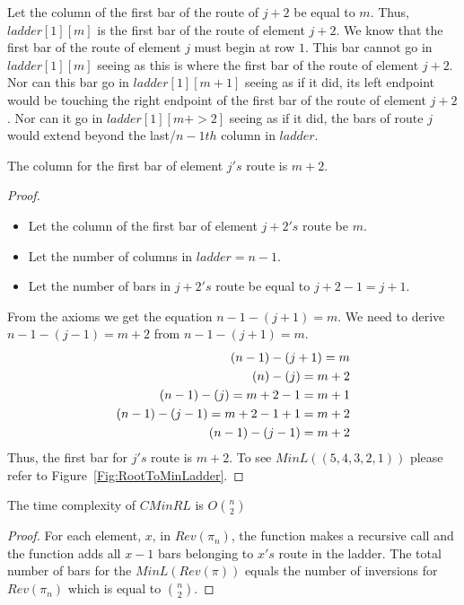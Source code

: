 Let the column of the first bar of the route of $j+2$ be equal to $m$. Thus, $ladder[1][m]$ is the first bar 
of the route of element $j+2$. We know that the first bar of the route of element $j$ must begin at row $1$. 
This bar cannot go in $ladder[1][m]$ seeing as this is where the first bar of the route of element $j+2$. 
Nor can this bar go in $ladder[1][m+1]$ seeing as if it did, its left endpoint would be touching the right 
endpoint of the first bar of the route of element $j+2$. Nor can it go in $ladder[1][m+>2]$ seeing as if it 
did, the bars of route $j$ would extend beyond the last/$n-1th$ column in $ladder$. 
\begin{lemma}
    The column for the first bar of element $j's$ route is $m+2$.
    
\end{lemma}
\begin{proof}
    \begin{itemize}
        \item     Let the column of the first bar of element $j+2's$ route be $m$. 
        \item     Let the number of columns in $ladder=n-1$.
        \item     Let the number of bars in $j+2's$ route be equal to $j+2-1=j+1$.
    \end{itemize}
        From the axioms we get the equation $n-1-(j+1)=m$.
        We need to derive $n-1-(j-1)=m+2$ from $n-1-(j+1)=m$.
   \begin{equation} \label{eq1}
        \centering
        \begin{split}
            (n-1)-(j+1)=m \\
            (n)-(j)= m+2\\
            (n-1)-(j)=m+2-1=m+1 \\ 
            (n-1)-(j-1)=m+2-1+1=m+2\\
            (n-1)-(j-1) = m+2\\
        \end{split}
    \end{equation}
   Thus, the first bar for $j's$ route is $m+2$.
   To see $MinL((5,4,3,2,1))$ please refer to Figure~\ref{Fig:RootToMinLadder}.
\end{proof}


\begin{lemma}
    The time complexity of $CMinRL$ is $O{n \choose 2}$ 
\end{lemma}
\begin{proof}
    For each element, $x$, in $Rev(\pi_{n})$, the function makes a recursive call and the function 
    adds all $x-1$ bars belonging to $x's$ route in the ladder. The total number of bars for the $MinL(Rev(\pi))$
    equals the number of inversions for $Rev(\pi_{n})$ which is equal to ${n \choose 2}$. 
\end{proof}




